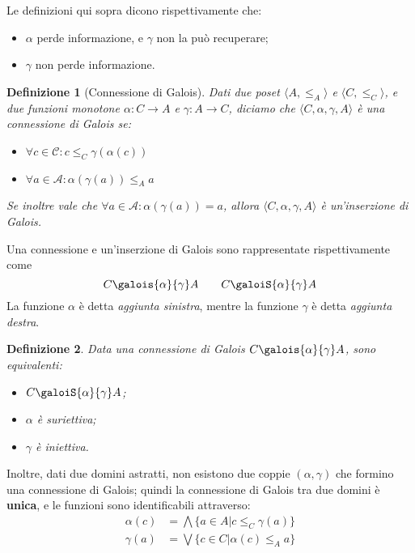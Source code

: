 \documentclass[a4paper, 11pt]{article}
\newcommand{\galoistuple}{\langle C, \alpha, \gamma , A \rangle}
\newtheorem{definit}{Definizione}[subsection]
\begin{document}
	Le definizioni qui sopra dicono rispettivamente che:
	\begin{itemize}
		\item $\alpha$ perde informazione, e $\gamma$ non la può recuperare;
		\item $\gamma$ non perde informazione.
	\end{itemize}

	\begin{definit}[Connessione di Galois]
		Dati due poset $\langle A , \leq_A \rangle$ e $\langle C , \leq_C \rangle$, e due funzioni monotone $\alpha: C \to A$ e $\gamma: A \to C$, diciamo che $\galoistuple$ è una connessione di Galois se:
		\begin{itemize}
			\item $\forall c \in \mathcal{C}: c \leq_C \gamma(\alpha(c))$
			\item $\forall a \in \mathcal{A}: \alpha(\gamma(a)) \leq_A a$
		\end{itemize}
		
		Se inoltre vale che $\forall a \in \mathcal{A}: \alpha(\gamma(a)) = a$, allora $\galoistuple$ è un'inserzione di Galois.
	\end{definit}
	Una connessione e un'inserzione di Galois sono rappresentate rispettivamente come \[  C \galois{\alpha}{\gamma} A \qquad C \galoiS{\alpha}{\gamma} A \]
	La funzione $\alpha$ è detta \textit{aggiunta sinistra}, mentre la funzione $\gamma$ è detta \textit{aggiunta destra}.
	
	\begin{definit}
		Data una connessione di Galois $ C \galois{\alpha}{\gamma} A$, sono equivalenti:
		\begin{itemize}
			\item $C \galoiS{\alpha}{\gamma} A$;
			\item $\alpha$ è suriettiva;
			\item $\gamma$ è iniettiva.
		\end{itemize}
	\end{definit}

	Inoltre, dati due domini astratti, non esistono due coppie $(\alpha, \gamma)$ che formino una connessione di Galois; quindi la connessione di Galois tra due domini è \textbf{unica}, e le funzioni sono identificabili attraverso:
	\begin{align*}
		\alpha(c) &= \bigwedge \lbrace a \in A \vert c \leq_C \gamma(a) \rbrace \\
		\gamma(a) &= \bigvee \lbrace c \in C \vert \alpha(c) \leq_A a \rbrace
	\end{align*}
	
\end{document}
